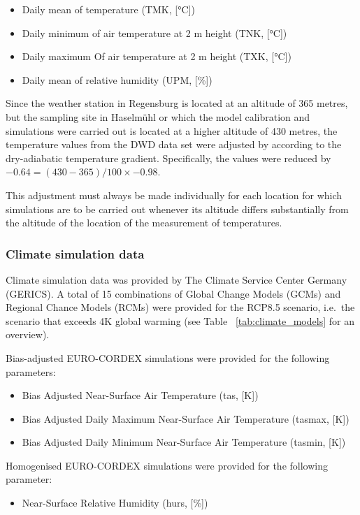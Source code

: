 \documentclass[a4paper, 11pt]{scrartcl}
\begin{document}
\begin{itemize}
	\item Daily mean of temperature (TMK, [°C])
	\item Daily minimum of air temperature at 2 m height (TNK, [°C])
	\item Daily maximum Of air temperature at 2 m height (TXK, [°C])
	\item Daily mean of relative humidity (UPM, [\%])
\end{itemize}

Since the weather station in Regensburg is located at an altitude of 365 metres, but the sampling site in Haselmühl or which the model calibration and simulations were carried out is located at a higher altitude of 430 metres, the temperature values from the DWD data set were adjusted by according to the dry-adiabatic temperature gradient. Specifically, the values were reduced by $-0.64 = (430 - 365) / 100 \times -0.98$.

This adjustment must always be made individually for each location for which simulations are to be carried out whenever its altitude differs substantially from the altitude of the location of the measurement of temperatures.

\subsubsection{Climate simulation data}
Climate simulation data was provided by The Climate Service Center Germany (GERICS). A total of 15 combinations of Global Change Models (GCMs) and Regional Chance Models (RCMs) were provided for the RCP8.5 scenario, i.e.\ the scenario that exceeds 4K global warming (see Table ~\ref{tab:climate_models} for an overview).

Bias-adjusted EURO-CORDEX simulations were provided for the following parameters:
\begin{itemize}
\item Bias Adjusted Near-Surface Air Temperature (tas, [K])
\item Bias Adjusted Daily Maximum Near-Surface Air Temperature (tasmax, [K])
\item Bias Adjusted Daily Minimum Near-Surface Air Temperature (tasmin, [K])
\end{itemize}

Homogenised EURO-CORDEX simulations were provided for the following parameter:
\begin{itemize}
\item Near-Surface Relative Humidity (hurs, [\%])
\end{itemize}
\end{document}
